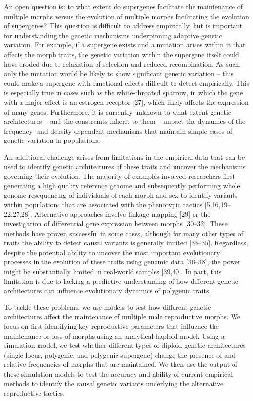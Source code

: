 \documentclass[
  11pt,
  a4paper,
]{article}
\begin{document}
An open question is: to what extent do supergenes facilitate the
maintenance of multiple morphs versus the evolution of multiple morphs
facilitating the evolution of supergenes? This question is difficult to
address empirically, but is important for understanding the genetic
mechanisms underpinning adaptive genetic variation. For example, if a
supergene exists and a mutation arises within it that affects the morph
traits, the genetic variation within the supergene itself could have
eroded due to relaxation of selection and reduced recombination. As
such, only the mutation would be likely to show significant genetic
variation -- this could make a supergene with functional effects
difficult to detect empirically. This is especially true in cases such
as the white-throated sparrow, in which the gene with a major effect is
an estrogen receptor {[}27{]},
which likely affects the expression of many genes. Furthermore, it is
currently unknown to what extent genetic architectures -- and the
constraints inherit to them -- impact the dynamics of the frequency- and
density-dependent mechanisms that maintain simple cases of genetic
variation in populations.

An additional challenge arises from limitations in the empirical data
that can be used to identify genetic architectures of these traits and
uncover the mechanisms governing their evolution. The majority of
examples involved researchers first generating a high quality reference
genome and subsequently performing whole genome resequencing of
individuals of each morph and sex to identify variants within
populations that are associated with the phenotypic tactics
{[}5,16,19--22,27,28{]}. Alternative approaches
involve linkage mapping {[}29{]} or the
investigation of differential gene expression between morphs
{[}30--32{]}. These methods have proven
successful in some cases, although for many other types of traits the
ability to detect causal variants is generally limited
{[}33--35{]}. Regardless, despite the
potential ability to uncover the most important evolutionary processes
in the evolution of these traits using genomic data
{[}36--38{]}, the power might be
substantially limited in real-world samples
{[}39,40{]}. In part, this limitation is
due to lacking a predictive understanding of how different genetic
architectures can influence evolutionary dynamics of polygenic traits.

To tackle these problems, we use models to test how different genetic
architectures affect the maintenance of multiple male reproductive
morphs. We focus on first identifying key reproductive parameters that
influence the maintenance or loss of morphs using an analytical haploid
model. Using a simulation model, we test whether different types of
diploid genetic architectures (single locus, polygenic, and polygenic
supergene) change the presence of and relative frequencies of morphs
that are maintained. We then use the output of these simulation models
to test the accuracy and ability of current empirical methods to
identify the causal genetic variants underlying the alternative
reproductive tactics.
\end{document}
